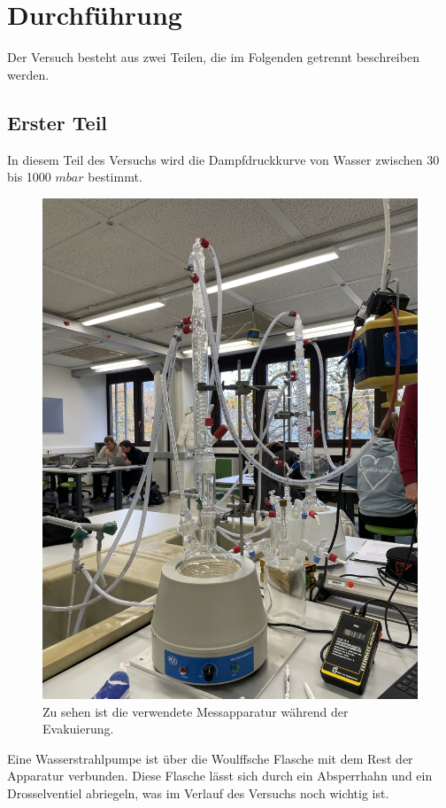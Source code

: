 \section{Durchführung}
\label{sec:Durchführung}

Der Versuch besteht aus zwei Teilen, die im Folgenden getrennt beschreiben werden.
\subsection{Erster Teil}
In diesem Teil des Versuchs wird die Dampfdruckkurve von Wasser zwischen 30 bis 1000 $mbar$ bestimmt.
\begin{figure}
    \centering
    \includegraphics[]{"Verwendete_Messapparatur"}
    \caption{Zu sehen ist die verwendete Messapparatur während der Evakuierung.}
    \label{Abb:Messapparatur}
\end{figure}
Eine Wasserstrahlpumpe ist über die Woulffsche Flasche mit dem Rest der Apparatur verbunden.
Diese Flasche lässt sich durch ein Absperrhahn und ein Drosselventiel abriegeln, was im Verlauf des Versuchs noch wichtig ist.
